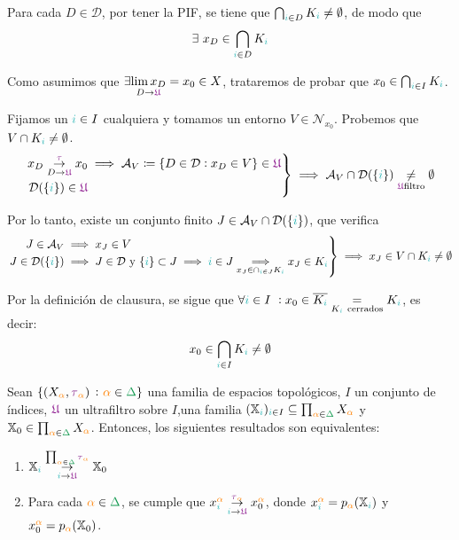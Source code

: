 \documentclass[titlepage,11pt,a4paper]{book}
\newcommand{\ultf}{\ensuremath{\textcolor{Plum}{\mathfrak{U}}}}
\newcommand{\ii}{\ensuremath{\textcolor{TealBlue}{i}}}
\newcommand{\alpa}{\textcolor{orange}{\alpha}}
\newcommand{\Delt}{\textcolor{ForestGreen}{\Delta}}
\newcommand{\taut}{\textcolor{Fuchsia}{\tau}}
\begin{document}
\begin{dem}
     \smallskip
     Para cada $D \in \mathcal{D}$, por tener la PIF, se tiene que $\bigcap_{\ii \in D} K_{\ii} \neq \emptyset$, de modo que
     \[
    \exists \ x_{D} \in \bigcap_{\ii \in D} K_{\ii}
     \]

    \smallskip
    Como asumimos que $\exists \underset{D \to \ultf}{\lim x_{D}} = x_{0} \in X$, trataremos de probar que $x_{0} \in \bigcap_{\ii \in I} K_{\ii}$.
    
    \smallskip
    Fijamos un $\ii \in I$ cualquiera y tomamos un entorno $V \in \mathcal{N}_{x_0}$. Probemos que $V \cap K_{\ii} \neq \emptyset$.
    \[
    \left.
    \begin{aligned}
        x_{D} \underset{D \to \ultf}{\overset{\taut}{\to}} x_{0} &\implies \mathcal{A}_{V} \coloneq \{D \in \mathcal{D} : x_{D} \in V\} \in \ultf\\
         \mathcal{D}(\{\ii\}) \in \ultf
    \end{aligned}
    \right\} \implies \mathcal{A}_{V} \cap \mathcal{D}(\{\ii\}) \underset{\ultf \text{filtro}}{\neq} \emptyset
    \]

    Por lo tanto, existe un conjunto finito $J \in \mathcal{A}_{V} \cap \mathcal{D}(\{\ii\})$, que verifica
    \[
    \left.
    \begin{aligned}   
    J \in \mathcal{A}_{V} & \implies x_{J} \in V\\
    J \in \mathcal{D}(\{\ii\}) & \implies J \in \mathcal D \text{ y } \{\ii\} \subset J \implies \ii \in J \underset{x_J \in \cap_{\ii \in J} K_{\ii}}{\implies} x_J \in K_{\ii}
    \end{aligned}
    \right\} \implies x_J \in V \cap K_{\ii} \neq \emptyset
    \]

    \medskip
    Por la definición de clausura, se sigue que $\forall \ii \in I \ : x_{0} \in \overline{K_{\ii}} \underset{K_{\ii} \ \text{cerrados}}{=} K_{\ii}$, es decir:
    \[
    x_{0} \in \bigcap_{\ii \in I} K_{\ii} \neq \emptyset
    \]
    \end{dem}


    \begin{prop*}{}
        Sean $\{(X_{\alpa}, \taut_{\alpa}) \ \colon \alpa \in \Delt\}$ una familia de espacios topológicos, $I$ un conjunto de índices, $\ultf$ un ultrafiltro sobre $I$,una familia $(\mathbb{X}_{\ii})_{\ii \in I} \subseteq \prod_{\alpa \in \Delt} X_{\alpa}$ y $\mathbb{X}_{0} \in \prod_{\alpa \in \Delt} X_{\alpa}$. Entonces, los siguientes resultados son equivalentes:
        \begin{enumerate}
            \item[(1)] $\mathbb{X}_{\ii} \underset{\ii \to \ultf}{\overset{\prod_{\alpa \in \Delt} \taut_{\alpa}}{\to}} \mathbb{X}_{0}$ 
            \item[(2)] Para cada $\alpa \in \Delt$, se cumple que $x_{\ii}^{\alpa} \underset{\ii \to \ultf}{\overset{\taut_{\alpa}}{\to}} x_{0}^{\alpa}$, donde $x_{\ii}^{\alpa} = p_{\alpa}(\mathbb{X}_{\ii})$ y $x_{0}^{\alpa} = p_{\alpa}(\mathbb{X}_{0})$.
        \end{enumerate}     
    \end{prop*}
\end{document}

